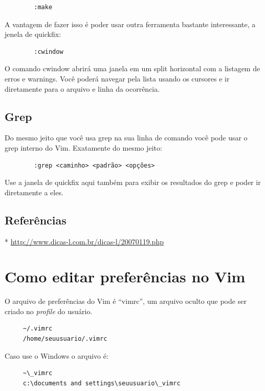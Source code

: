 \documentclass[10pt,a4paper,openany]{book}
\begin{document}
\begin{verbatim}
		:make
\end{verbatim}

A vantagem de fazer isso é poder usar outra ferramenta bastante interessante, a jenela
de quickfix:

\begin{verbatim}
		:cwindow
\end{verbatim}

O comando cwindow abrirá uma janela em um split horizontal com a listagem de erros e warnings.
Você poderá navegar pela lista usando os cursores e ir diretamente para o arquivo e linha da 
ocorrência.

\section{Grep}
Do mesmo jeito que você usa grep na sua linha de comando você pode usar o grep interno
do Vim. Exatamente do mesmo jeito:

\begin{verbatim}
		:grep <caminho> <padrão> <opções>
\end{verbatim}

Use a janela de quickfix aqui também para exibir os resultados do grep e poder ir diretamente 
a eles.

\section{Referências}
* \url{http://www.dicas-l.com.br/dicas-l/20070119.php}

\chapter{Como editar preferências no Vim}\label{cha:Como editar preferências no Vim}
O arquivo de preferências do Vim é ``vimrc'', um arquivo oculto que
pode ser criado no {\em profile} do usuário.

\begin{verbatim}
     ~/.vimrc
     /home/seuusuario/.vimrc
\end{verbatim}

Caso use o Windows o arquivo é:

\begin{verbatim}
     ~\_vimrc
     c:\documents and settings\seuusuario\_vimrc
\end{verbatim}
\end{document}
